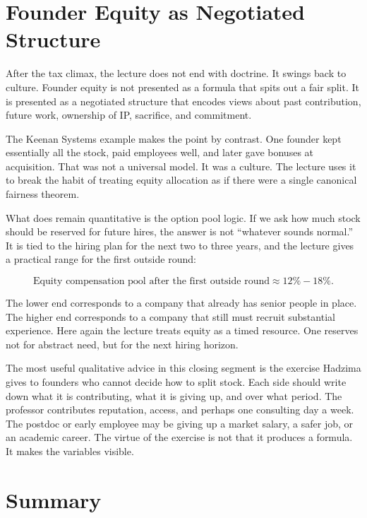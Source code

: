 \section{Founder Equity as Negotiated Structure}

After the tax climax, the lecture does not end with doctrine. It swings back to culture. Founder equity is not presented as a formula that spits out a fair split. It is presented as a negotiated structure that encodes views about past contribution, future work, ownership of IP, sacrifice, and commitment.

The Keenan Systems example makes the point by contrast. One founder kept essentially all the stock, paid employees well, and later gave bonuses at acquisition. That was not a universal model. It was a culture. The lecture uses it to break the habit of treating equity allocation as if there were a single canonical fairness theorem.

What does remain quantitative is the option pool logic. If we ask how much stock should be reserved for future hires, the answer is not ``whatever sounds normal.'' It is tied to the hiring plan for the next two to three years, and the lecture gives a practical range for the first outside round:

\begin{equation}
\text{Equity compensation pool after the first outside round}\approx 12\%-18\%.
\end{equation}

The lower end corresponds to a company that already has senior people in place. The higher end corresponds to a company that still must recruit substantial experience. Here again the lecture treats equity as a timed resource. One reserves not for abstract need, but for the next hiring horizon.

The most useful qualitative advice in this closing segment is the exercise Hadzima gives to founders who cannot decide how to split stock. Each side should write down what it is contributing, what it is giving up, and over what period. The professor contributes reputation, access, and perhaps one consulting day a week. The postdoc or early employee may be giving up a market salary, a safer job, or an academic career. The virtue of the exercise is not that it produces a formula. It makes the variables visible.

\section{Summary}

